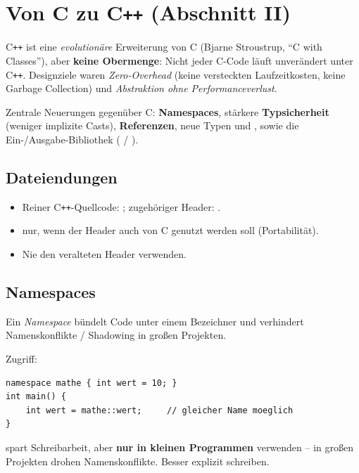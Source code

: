 \section{Von C zu C\texttt{++} (Abschnitt II)}
C\texttt{++} ist eine \emph{evolution\"are} Erweiterung von C (Bjarne Stroustrup, ``C with Classes''), aber \textbf{keine Obermenge}: Nicht jeder C-Code l\"auft unverändert unter C\texttt{++}. Designziele waren \emph{Zero-Overhead} (keine versteckten Laufzeitkosten, keine Garbage Collection) und \emph{Abstraktion ohne Performanceverlust}.

\begin{merke}
Zentrale Neuerungen gegen\"uber C: \textbf{Namespaces}, st\"arkere \textbf{Typsicherheit} (weniger implizite Casts), \textbf{Referenzen}, neue Typen  und , sowie die Ein-/Ausgabe-Bibliothek  ( / ).
\end{merke}

\subsection{Dateiendungen}
\begin{itemize}
  \item Reiner C\texttt{++}-Quellcode: \textbf{}; zugeh\"origer Header: \textbf{}.
  \item {} nur, wenn der Header auch von C genutzt werden soll (Portabilit\"at).
  \item Nie den veralteten Header  verwenden.
\end{itemize}

\subsection{Namespaces}
Ein \emph{Namespace} b\"undelt Code unter einem Bezeichner und verhindert Namenskonflikte / Shadowing in gro\ss en Projekten.
\begin{syntaxbox}
 \quad Zugriff: 
\end{syntaxbox}
\begin{lstlisting}
namespace mathe { int wert = 10; }
int main() {
    int wert = mathe::wert;     // gleicher Name moeglich
}
\end{lstlisting}
\begin{tipp}
 spart Schreibarbeit, aber \textbf{nur in kleinen Programmen} verwenden -- in gro\ss en Projekten drohen Namenskonflikte. Besser explizit  schreiben.
\end{tipp}

